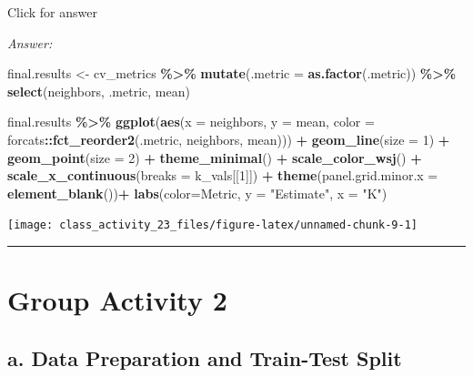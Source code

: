 \documentclass[
]{book}
\newenvironment{Shaded}{\begin{snugshade}}{\end{snugshade}}
\newcommand{\AttributeTok}[1]{\textcolor[rgb]{0.13,0.29,0.53}{#1}}
\newcommand{\DecValTok}[1]{\textcolor[rgb]{0.00,0.00,0.81}{#1}}
\newcommand{\FunctionTok}[1]{\textcolor[rgb]{0.13,0.29,0.53}{\textbf{#1}}}
\newcommand{\NormalTok}[1]{#1}
\newcommand{\OtherTok}[1]{\textcolor[rgb]{0.56,0.35,0.01}{#1}}
\newcommand{\SpecialCharTok}[1]{\textcolor[rgb]{0.81,0.36,0.00}{\textbf{#1}}}
\newcommand{\StringTok}[1]{\textcolor[rgb]{0.31,0.60,0.02}{#1}}
\begin{document}
Click for answer

\emph{Answer:}

\begin{Shaded}
\begin{Highlighting}[]
\NormalTok{final.results }\OtherTok{\textless{}{-}}\NormalTok{ cv\_metrics }\SpecialCharTok{\%\textgreater{}\%}  \FunctionTok{mutate}\NormalTok{(}\AttributeTok{.metric =} \FunctionTok{as.factor}\NormalTok{(.metric)) }\SpecialCharTok{\%\textgreater{}\%}
  \FunctionTok{select}\NormalTok{(neighbors, .metric, mean)}

\NormalTok{final.results }\SpecialCharTok{\%\textgreater{}\%}
  \FunctionTok{ggplot}\NormalTok{(}\FunctionTok{aes}\NormalTok{(}\AttributeTok{x =}\NormalTok{ neighbors, }\AttributeTok{y =}\NormalTok{ mean, }\AttributeTok{color =}\NormalTok{ forcats}\SpecialCharTok{::}\FunctionTok{fct\_reorder2}\NormalTok{(.metric, neighbors, mean))) }\SpecialCharTok{+}
  \FunctionTok{geom\_line}\NormalTok{(}\AttributeTok{size =} \DecValTok{1}\NormalTok{) }\SpecialCharTok{+}
  \FunctionTok{geom\_point}\NormalTok{(}\AttributeTok{size =} \DecValTok{2}\NormalTok{) }\SpecialCharTok{+}
  \FunctionTok{theme\_minimal}\NormalTok{() }\SpecialCharTok{+}
  \FunctionTok{scale\_color\_wsj}\NormalTok{() }\SpecialCharTok{+} 
  \FunctionTok{scale\_x\_continuous}\NormalTok{(}\AttributeTok{breaks =}\NormalTok{ k\_vals[[}\DecValTok{1}\NormalTok{]]) }\SpecialCharTok{+}
  \FunctionTok{theme}\NormalTok{(}\AttributeTok{panel.grid.minor.x =} \FunctionTok{element\_blank}\NormalTok{())}\SpecialCharTok{+}
  \FunctionTok{labs}\NormalTok{(}\AttributeTok{color=}\StringTok{\textquotesingle{}Metric\textquotesingle{}}\NormalTok{, }\AttributeTok{y =} \StringTok{"Estimate"}\NormalTok{, }\AttributeTok{x =} \StringTok{"K"}\NormalTok{)}
\end{Highlighting}
\end{Shaded}

\texttt{[image: class\_activity\_23\_files/figure-latex/unnamed-chunk-9-1]}

\begin{center}\rule{0.5\linewidth}{0.5pt}\end{center}

\hypertarget{group-activity-2-7}{%
\section{Group Activity 2}\label{group-activity-2-7}}

\hypertarget{a.-data-preparation-and-train-test-split}{%
\subsection{a. Data Preparation and Train-Test Split}\label{a.-data-preparation-and-train-test-split}}
\end{document}
